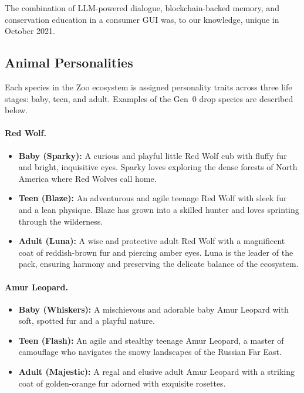 The combination of LLM-powered dialogue, blockchain-backed memory, and conservation education in a consumer GUI was, to our knowledge, unique in October 2021.

\subsection{Animal Personalities}

Each species in the Zoo ecosystem is assigned personality traits across three life stages: baby, teen, and adult. Examples of the Gen~0 drop species are described below.

\paragraph{Red Wolf.}
\begin{itemize}[nosep]
\item \textbf{Baby (Sparky):} A curious and playful little Red Wolf cub with fluffy fur and bright, inquisitive eyes. Sparky loves exploring the dense forests of North America where Red Wolves call home.
\item \textbf{Teen (Blaze):} An adventurous and agile teenage Red Wolf with sleek fur and a lean physique. Blaze has grown into a skilled hunter and loves sprinting through the wilderness.
\item \textbf{Adult (Luna):} A wise and protective adult Red Wolf with a magnificent coat of reddish-brown fur and piercing amber eyes. Luna is the leader of the pack, ensuring harmony and preserving the delicate balance of the ecosystem.
\end{itemize}

\paragraph{Amur Leopard.}
\begin{itemize}[nosep]
\item \textbf{Baby (Whiskers):} A mischievous and adorable baby Amur Leopard with soft, spotted fur and a playful nature.
\item \textbf{Teen (Flash):} An agile and stealthy teenage Amur Leopard, a master of camouflage who navigates the snowy landscapes of the Russian Far East.
\item \textbf{Adult (Majestic):} A regal and elusive adult Amur Leopard with a striking coat of golden-orange fur adorned with exquisite rosettes.
\end{itemize}

